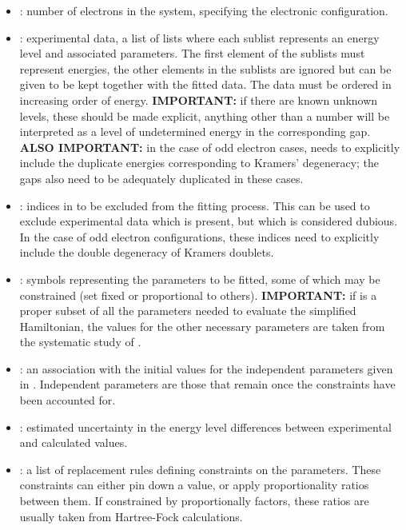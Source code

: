 \documentclass[11pt, twoside,openright]{article}
\begin{document}
\begin{itemize}
	\item {}: number of electrons in the system, specifying the electronic configuration.

	\item {}: experimental data, a list of lists where each sublist represents an energy level and associated parameters. The first element of the sublists must represent energies, the other elements in the sublists are ignored but can be given to be kept together with the fitted data. The data must be ordered in increasing order of energy. \textbf{IMPORTANT:} if there are known unknown levels, these should be made explicit, anything other than a number will be interpreted as a level of undetermined energy in the corresponding gap. \textbf{ALSO IMPORTANT:} in the case of odd electron cases,  needs to explicitly include the duplicate energies corresponding to Kramers' degeneracy; the gaps also need to be adequately duplicated in these cases.  

	\item {}: indices in  to be excluded from the fitting process. This can be used to exclude experimental data which is present, but which is considered dubious. In the case of odd electron configurations, these indices need to explicitly include the double degeneracy of Kramers doublets.

	\item {}: symbols representing the parameters to be fitted, some of which may be constrained (set fixed or proportional to others). \textbf{IMPORTANT:} if  is a proper subset of all the parameters needed to evaluate the simplified Hamiltonian, the values for the other necessary parameters are taken from the \bill systematic study of \LaFthree.

	\item {}: an association with the initial values for the independent parameters given in . Independent parameters are those that remain once the constraints have been accounted for.

	\item {}: estimated uncertainty in the energy level differences between experimental and calculated values.

	\item {}: a list of replacement rules defining constraints on the parameters. These constraints can either pin down a value, or apply proportionality ratios between them. If constrained by proportionally factors, these ratios are usually taken from Hartree-Fock calculations.
\end{itemize}
\end{document}
